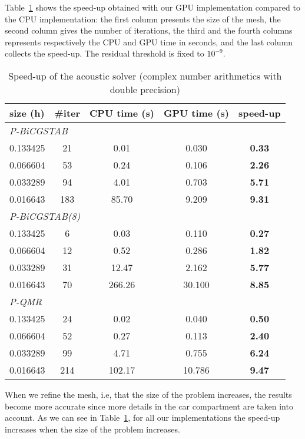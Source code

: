 \documentclass[10pt]{article}
\theoremstyle{plain}
\theoremstyle{definition}
\theoremstyle{remark}
\begin{document}
Table~\ref{Table2} shows the speed-up obtained with our GPU implementation compared to the CPU implementation: the first column presents the size of the mesh, the second column gives the number of iterations, the third and the fourth columns represents respectively the CPU and GPU time in seconds, and the last column collects the speed-up.
The residual threshold is fixed to $10^{-9}$.
%
\begin{table}[htbp]
\setlength\columnsep{0.1pt}
\begin{center}
\caption{Speed-up of the acoustic solver (complex number arithmetics with double precision)}\label{Table2}
\begin{tabular}{lcccc}
\hline
size (h) & \#iter & CPU time (s) & GPU time (s) & speed-up \\
\hline
\multicolumn{3}{l}{\emph{P-BiCGSTAB}} & & \\
0.133425 & 21 & 0.01 & 0.030 & \textbf{0.33} \\
0.066604 & 53 &  0.24 & 0.106 & \textbf{2.26} \\
0.033289 & 94 &  4.01 & 0.703 & \textbf{5.71} \\
0.016643 & 183 & 85.70 & 9.209 & \textbf{9.31} \\
\hline
\multicolumn{3}{l}{\emph{P-BiCGSTAB(8)}} & & \\
0.133425 & 6 & 0.03 & 0.110 & \textbf{0.27} \\
0.066604 & 12 & 0.52 & 0.286 & \textbf{1.82} \\
0.033289 & 31 & 12.47 & 2.162 & \textbf{5.77} \\
0.016643 & 70 & 266.26 & 30.100 & \textbf{8.85} \\
\hline
\multicolumn{3}{l}{\emph{P-QMR}} & & \\
0.133425 & 24 & 0.02 & 0.040 & \textbf{0.50} \\
0.066604 & 52 & 0.27 & 0.113 & \textbf{2.40} \\
0.033289 & 99 &  4.71 & 0.755 & \textbf{6.24} \\
0.016643 & 214 &  102.17 & 10.786 & \textbf{9.47} \\
\hline
\end{tabular}
\end{center}
\end{table}
%
When we refine the mesh, i.e, that the size of the problem increases, the results become more accurate since more details in the car compartment are taken into account.
As we can see in Table~\ref{Table2}, for all our implementations the speed-up increases when the size of the problem increases.
\end{document}
